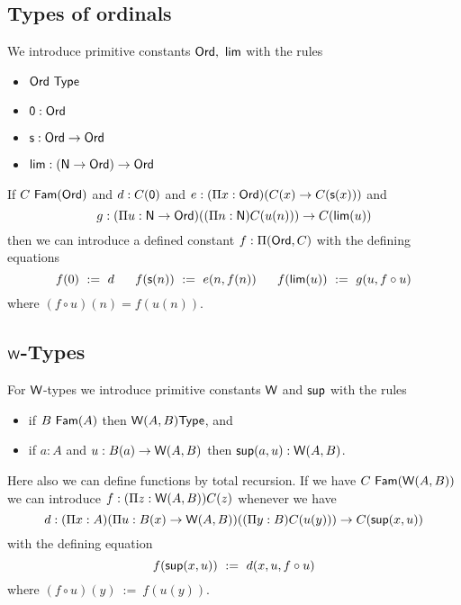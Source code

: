 {\subsection*{Types of ordinals}
We introduce primitive constants ${\sf Ord},~{\sf lim}$ with the rules
\begin{itemize}
\item ${\sf Ord}~{\sf Type}$
\item ${\sf 0}:{\sf Ord}$
\item ${\sf s}:{\sf Ord}\rightarrow{\sf Ord}$
\item ${\sf lim}:({\sf N}\rightarrow{\sf Ord})\rightarrow{\sf Ord}$
\end{itemize}
If $C~{\sf Fam}({\sf Ord})$ and $d:C({\sf 0})$ and $e:(\Pi x:{\sf Ord})(C(x)\rightarrow C({\sf s}(x)))$ and
$$g:(\Pi u:{\sf N}\rightarrow{\sf Ord})((\Pi n:{\sf N})C(u(n)))\rightarrow C({\sf lim}(u))$$
then we can introduce a defined constant $f:\Pi({\sf Ord},C)$ with the defining equations
$$
f(0) ~:=~ d~~~~~f({\sf s}(n)) ~:=~ e(n,f(n))~~~~~f({\sf lim}(u)) ~:=~ g(u,f\circ u)
$$
where $(f\circ u)(n) = f(u(n))$.

\subsection*{${\sf W}$-Types}
For ${\sf W}$-types we introduce primitive constants ${\sf W}$ and ${\sf sup}$ with the rules
\begin{itemize}
\item if $B~{\sf Fam}(A)$ then ${\sf W}(A,B){\sf Type}$, and
\item if $a:A$ and $u:B(a)\rightarrow {\sf W}(A,B)$ then ${\sf sup}(a,u):{\sf W}(A,B)$.
\end{itemize}
 
 Here also we can define functions by total recursion. If we have
$C~{\sf Fam}({\sf W}(A,B))$ we can introduce $f:(\Pi z:{\sf W}(A,B))C(z)$ whenever we have
$$
d:(\Pi x:A)(\Pi u:B(x)\rightarrow {\sf W}(A,B))((\Pi y:B)C(u(y)))\rightarrow C({\sf sup}(x,u))
$$
with the defining equation
$$
f({\sf sup}(x,u)) ~:=~ d(x,u,f\circ u)
$$
where $(f\circ u)(y) ~:=~ f(u(y))$.

}
